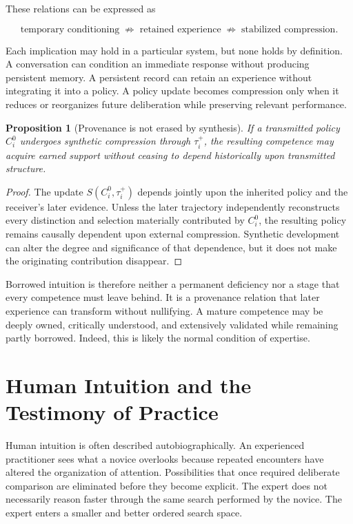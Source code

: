 \documentclass[11pt]{article}
\newtheorem{proposition}{Proposition}[section]
\begin{document}
These relations can be expressed as

\[
\text{temporary conditioning}
\;\not\Rightarrow\;
\text{retained experience}
\;\not\Rightarrow\;
\text{stabilized compression}.
\]

Each implication may hold in a particular system, but none holds by definition. A conversation can condition an immediate response without producing persistent memory. A persistent record can retain an experience without integrating it into a policy. A policy update becomes compression only when it reduces or reorganizes future deliberation while preserving relevant performance.

\begin{proposition}[Provenance is not erased by synthesis]
If a transmitted policy $C_i^0$ undergoes synthetic compression through $\tau_i^{+}$, the resulting competence may acquire earned support without ceasing to depend historically upon transmitted structure.
\end{proposition}

\begin{proof}
The update $S(C_i^0,\tau_i^{+})$ depends jointly upon the inherited policy and the receiver's later evidence. Unless the later trajectory independently reconstructs every distinction and selection materially contributed by $C_i^0$, the resulting policy remains causally dependent upon external compression. Synthetic development can alter the degree and significance of that dependence, but it does not make the originating contribution disappear.
\end{proof}

Borrowed intuition is therefore neither a permanent deficiency nor a stage that every competence must leave behind. It is a provenance relation that later experience can transform without nullifying. A mature competence may be deeply owned, critically understood, and extensively validated while remaining partly borrowed. Indeed, this is likely the normal condition of expertise.

\section{Human Intuition and the Testimony of Practice}

Human intuition is often described autobiographically. An experienced practitioner sees what a novice overlooks because repeated encounters have altered the organization of attention. Possibilities that once required deliberate comparison are eliminated before they become explicit. The expert does not necessarily reason faster through the same search performed by the novice. The expert enters a smaller and better ordered search space.
\end{document}
